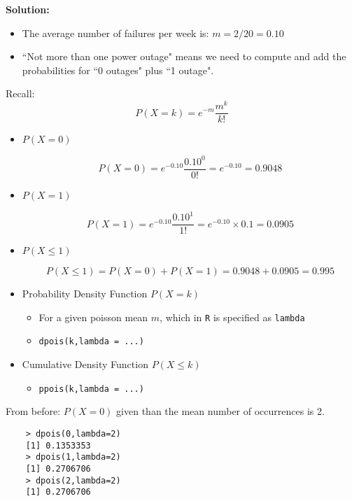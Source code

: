 \documentclass[]{article}
\begin{document}
	\textbf{Solution:}
	
	\begin{itemize}
		\item The average number of failures per week is: $m = 2/20 = 0.10$
		
		\item ``Not more than one  power outage" means we need to compute and add the probabilities for ``0 outages" plus ``1 outage".
	\end{itemize}
	

	
	Recall: \[P(X = k) = e^{-m}\frac{m^k}{k!}\]
	
	
	\begin{itemize}
		
		\item $P(X = 0)$
		
		\[P(X = 0) = e^{-0.10}\frac{0.10^0}{0!} = e^{-0.10} = 0.9048\]
		
		
		\item $P(X = 1)$
		
		\[P(X = 1) = e^{-0.10}\frac{0.10^1}{1!} = e^{-0.10}\times 0.1 = 0.0905\]
		
		\item $P(X \leq 1)$
		
		\[P(X \leq 1) = P(X = 0) + P(X = 1) = 0.9048 + 0.0905 = 0.995\]
		
	\end{itemize}
	
	\begin{itemize}
		\item Probability Density Function $P(X = k)$
		\begin{itemize}
			\item For a given poisson mean $m$, which in \texttt{R} is specified as \texttt{lambda} 
			\item \texttt{dpois(k,lambda = ...)} 
		\end{itemize}
		\item Cumulative Density Function $P(X \leq k)$
		\begin{itemize}
			\item \texttt{ppois(k,lambda = ...)}
		\end{itemize}
	\end{itemize}
	

	From before: $P(X = 0)$ given than the mean number of occurrences is 2.
	
	\begin{verbatim}
	> dpois(0,lambda=2)
	[1] 0.1353353
	> dpois(1,lambda=2)
	[1] 0.2706706
	> dpois(2,lambda=2)
	[1] 0.2706706
	\end{verbatim}
\end{document}

